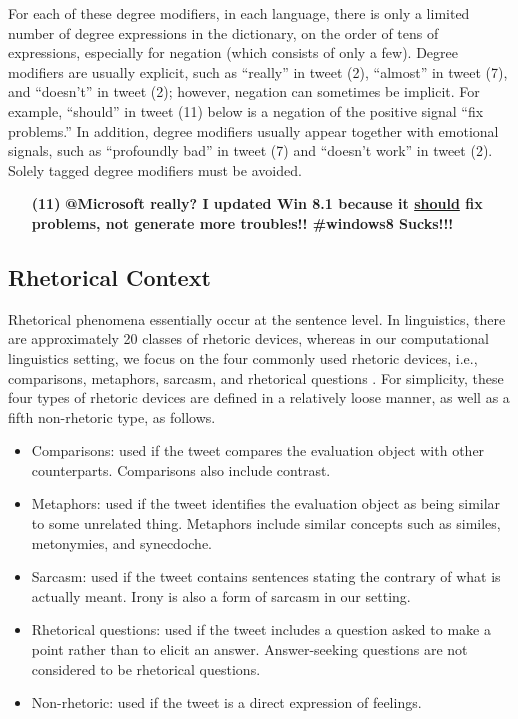 \documentclass[english]{jnlp_1.4}
\begin{document}
For each of these degree modifiers, in each language, there is only a limited number of degree expressions in the dictionary, on the order of tens of expressions, especially for negation (which consists of only a few). Degree modifiers are usually explicit, such as ``really'' in tweet (2), ``almost'' in tweet (7), and ``doesn't'' in tweet (2); however, negation can sometimes be implicit. For example, ``should'' in tweet (11) below is a negation of the positive signal ``fix problems.'' In addition, degree modifiers usually appear together with emotional signals, such as ``profoundly bad'' in tweet (7) and ``doesn't work'' in tweet (2). Solely tagged degree modifiers must be avoided.
\begin{enumerate}
\item[{\bf (11)}] {\bf @Microsoft really? I updated Win 8.1 because it \underline{should} fix problems, not generate more troubles!! \#windows8 Sucks!!!}
\end{enumerate}


\subsection{Rhetorical Context}

Rhetorical phenomena essentially occur at the sentence level. In linguistics, there are approximately 20 classes of rhetoric devices, whereas in our computational linguistics setting, we focus on the four commonly used rhetoric devices, i.e., comparisons, metaphors, sarcasm, and rhetorical questions \cite{Bhattasali15,Ganapathibhotla08,Ghosh15}. For simplicity, these four types of rhetoric devices are defined in a relatively loose manner, as well as a fifth non-rhetoric type, as follows.

\begin{itemize}
\item Comparisons: used if the tweet compares the evaluation object with other counterparts. Comparisons also include contrast. 
\item Metaphors: used if the tweet identifies the evaluation object as being similar to some unrelated thing. Metaphors include similar concepts such  as similes, metonymies, and synecdoche.
\item Sarcasm: used if the tweet contains sentences stating the contrary of what is actually meant. Irony is also a form of sarcasm in our setting.
\item Rhetorical questions: used if the tweet includes a question asked to make a point rather than to elicit an answer. Answer-seeking questions are not considered to be rhetorical questions.
\item Non-rhetoric: used if the tweet is a direct expression of feelings.
\end{itemize}
\end{document}
